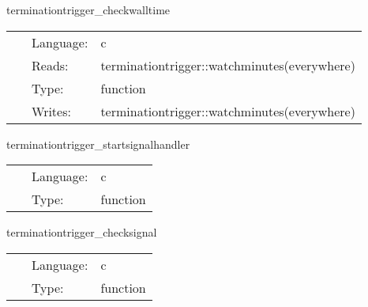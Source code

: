 
\hspace{5mm} terminationtrigger\_checkwalltime 

\hspace{5mm}{\it check elapsed job walltime } 


\hspace{5mm}

 \begin{tabular*}{160mm}{cll} 
~ & Language:  & c \\ 
~ & Reads:  & terminationtrigger::watchminutes(everywhere) \\ 
~ & Type:  & function \\ 
~ & Writes:  & terminationtrigger::watchminutes(everywhere) \\ 
\end{tabular*} 


\vspace{5mm}


\hspace{5mm} terminationtrigger\_startsignalhandler 

\hspace{5mm}{\it start signal handler } 


\hspace{5mm}

 \begin{tabular*}{160mm}{cll} 
~ & Language:  & c \\ 
~ & Type:  & function \\ 
\end{tabular*} 


\vspace{5mm}


\hspace{5mm} terminationtrigger\_checksignal 

\hspace{5mm}{\it check if we received a termination signal } 


\hspace{5mm}

 \begin{tabular*}{160mm}{cll} 
~ & Language:  & c \\ 
~ & Type:  & function \\ 
\end{tabular*} 


\vspace{5mm}

